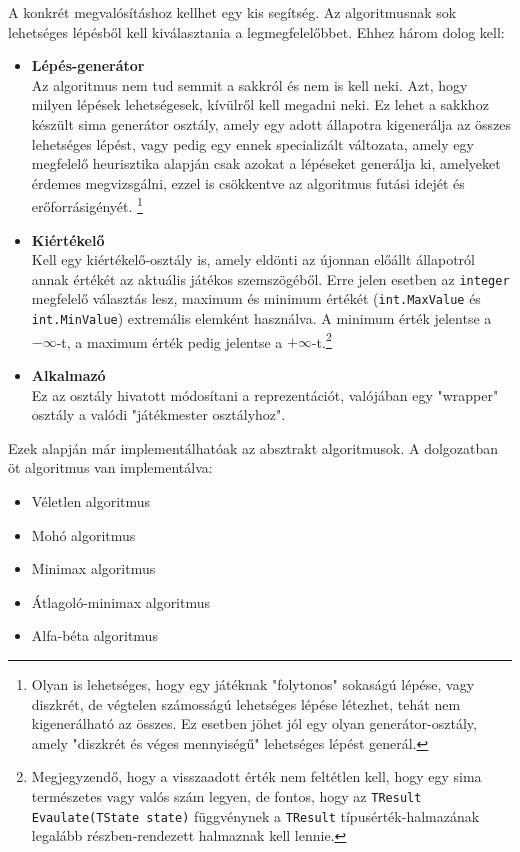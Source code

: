 \documentclass[twoside, a4paper, 12pt]{article}
\begin{document}
A konkrét megvalósításhoz kellhet egy kis segítség. Az algoritmusnak sok lehetséges lépésből kell kiválasztania a legmegfelelőbbet. Ehhez három dolog kell:

\begin{itemize}
	\item \textbf{Lépés-generátor} \\
	Az algoritmus nem tud semmit a sakkról és nem is kell neki. Azt, hogy milyen lépések lehetségesek, kívülről kell megadni neki. Ez lehet a sakkhoz készült sima generátor osztály, amely egy adott állapotra kigenerálja az összes lehetséges lépést, vagy pedig egy ennek specializált változata, amely egy megfelelő heurisztika alapján csak azokat a lépéseket generálja ki, amelyeket érdemes megvizsgálni, ezzel is csökkentve az algoritmus futási idejét és erőforrásigényét. \footnote{Olyan is lehetséges, hogy egy játéknak "folytonos" sokaságú lépése, vagy diszkrét, de végtelen számosságú lehetséges lépése létezhet, tehát nem kigenerálható az összes. Ez esetben jöhet jól egy olyan generátor-osztály, amely "diszkrét és véges mennyiségű" lehetséges lépést generál.}
	
	\item \textbf{Kiértékelő} \\
	Kell egy kiértékelő-osztály is, amely eldönti az újonnan előállt állapotról annak értékét az aktuális játékos szemszögéből. Erre jelen esetben az \texttt{integer} megfelelő választás lesz, maximum és minimum értékét (\texttt{int.MaxValue} és \texttt{int.MinValue}) extremális elemként használva. A minimum érték jelentse a $-\infty$-t, a maximum érték pedig jelentse a $+\infty$-t.\footnote{Megjegyzendő, hogy a visszaadott érték nem feltétlen kell, hogy egy sima természetes vagy valós szám legyen, de fontos, hogy az \texttt{TResult Evaulate(TState state)} függvénynek a \texttt{TResult} típusérték-halmazának legalább részben-rendezett halmaznak kell lennie.}
	
	
	\item \textbf{Alkalmazó} \\
	Ez az osztály hivatott módosítani a reprezentációt, valójában egy "wrapper" osztály a valódi "játékmester osztályhoz".
\end{itemize}

Ezek alapján már implementálhatóak az absztrakt algoritmusok. A dolgozatban öt algoritmus van implementálva:
\begin{itemize}
	\item Véletlen algoritmus
	\item Mohó algoritmus
	\item Minimax algoritmus
	\item Átlagoló-minimax algoritmus
	\item Alfa-béta algoritmus
\end{itemize}
\end{document}
